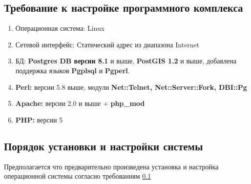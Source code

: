 \documentclass[12pt,a4paper]{article}
\begin{document}
\subsection{Требование к настройке программного комплекса}\label{lab1}
\begin{enumerate}
\item Операционная система: Linux
\item Сетевой интерфейс: Статический адрес из диапазона Internet
\item БД: \textbf{Postgres DB версии 8.1} и выше, \textbf{PostGIS 1.2} и выше, добавлена поддержка языков \textbf{Pgplsql} и \textbf{Pgperl}.
\item \textbf{Perl:} версии 5.8 выше, модули \textbf{Net::Telnet, Net::Server::Fork, DBI::Pg}
\item \textbf{Apache:} версии 2.0 и выше + \textbf{php\_mod} 
\item \textbf{PHP:} версии 5
\end{enumerate}
\subsection{Порядок установки и настройки системы}
Предполагается что предварительно произведена установка и настройка операционной системы согласно требованиям \ref{lab1}
\end{document}
